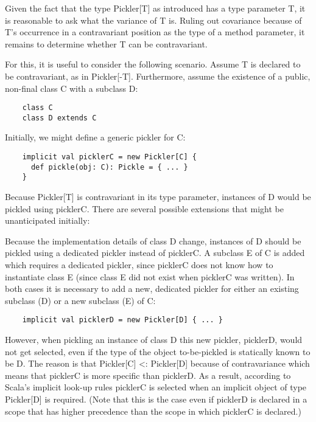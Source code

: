 \documentclass[preprint,10pt]{sigplanconf}
\begin{document}
Given the fact that the type Pickler[T] as introduced has a type parameter T, it is reasonable to ask what the variance of T is. Ruling out covariance because of T's occurrence in a contravariant position as the type of a method parameter, it remains to determine whether T can be contravariant.

For this, it is useful to consider the following scenario. Assume T is declared to be contravariant, as in Pickler[-T]. Furthermore, assume the existence of a public, non-final class C with a subclass D:

\begin{verbatim}
    class C
    class D extends C
\end{verbatim}

Initially, we might define a generic pickler for C:

\begin{verbatim}
    implicit val picklerC = new Pickler[C] {
      def pickle(obj: C): Pickle = { ... }
    }
\end{verbatim}

Because Pickler[T] is contravariant in its type parameter, instances of D would be pickled using picklerC. There are several possible extensions that might be unanticipated initially:

Because the implementation details of class D change, instances of D should be pickled using a dedicated pickler instead of picklerC.
A subclass E of C is added which requires a dedicated pickler, since picklerC does not know how to instantiate class E (since class E did not exist when picklerC was written).
In both cases it is necessary to add a new, dedicated pickler for either an existing subclass (D) or a new subclass (E) of C:

\begin{verbatim}
    implicit val picklerD = new Pickler[D] { ... }
\end{verbatim}

However, when pickling an instance of class D this new pickler, picklerD, would not get selected, even if the type of the object to-be-pickled is statically known to be D. The reason is that Pickler[C] <: Pickler[D] because of contravariance which means that picklerC is more specific than picklerD. As a result, according to Scala's implicit look-up rules picklerC is selected when an implicit object of type Pickler[D] is required. (Note that this is the case even if picklerD is declared in a scope that has higher precedence than the scope in which picklerC is declared.)
\end{document}
